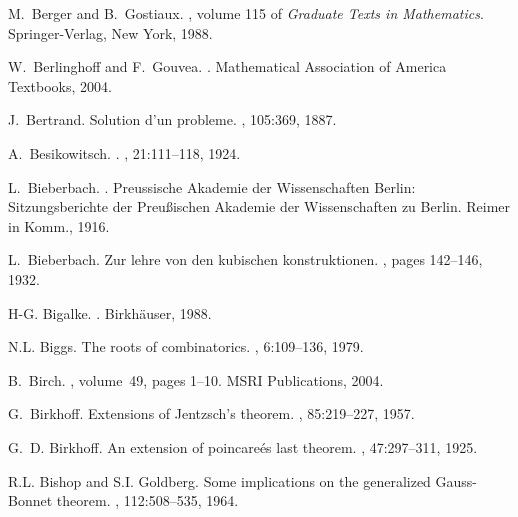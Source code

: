 \documentclass[12pt]{amsart}
\begin{document}
\begin{thebibliography}{100}
M.~Berger and B.~Gostiaux.
, volume
  115 of {\em Graduate Texts in Mathematics}.
\newblock Springer-Verlag, New York, 1988.

W.~Berlinghoff and F.~Gouvea.
.
\newblock Mathematical Association of America Textbooks, 2004.

J.~Bertrand.
\newblock Solution d'un probleme.
, 105:369, 1887.

A.~Besikowitsch.
.
, 21:111--118, 1924.

L.~Bieberbach.
.
\newblock Preussische Akademie der Wissenschaften Berlin: Sitzungsberichte der
  Preu{\ss}ischen Akademie der Wissenschaften zu Berlin. Reimer in Komm., 1916.

L.~Bieberbach.
\newblock Zur lehre von den kubischen konstruktionen.
, pages
  142--146, 1932.

H-G. Bigalke.
.
\newblock Birkh{\"a}user, 1988.

N.L. Biggs.
\newblock The roots of combinatorics.
, 6:109--136, 1979.

B.~Birch.
, volume~49, pages 1--10.
\newblock MSRI Publications, 2004.

G.~Birkhoff.
\newblock Extensions of {J}entzsch's theorem.
, 85:219--227, 1957.

G.~D. Birkhoff.
\newblock An extension of poincare\'es last theorem.
, 47:297--311, 1925.

R.L. Bishop and S.I. Goldberg.
\newblock Some implications on the generalized {G}auss-{B}onnet theorem.
, 112:508--535, 1964.


\end{thebibliography}
\end{document}
